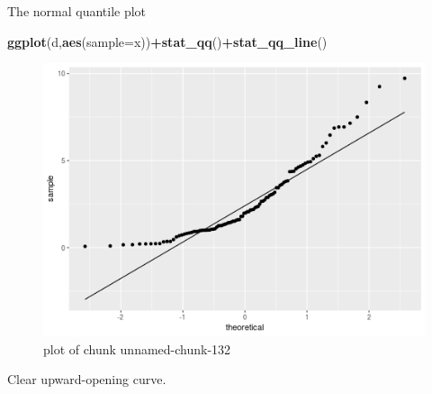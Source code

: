\documentclass[ignorenonframetext,]{beamer}
\newenvironment{Shaded}{\begin{snugshade}}{\end{snugshade}}
\newcommand{\DataTypeTok}[1]{\textcolor[rgb]{0.13,0.29,0.53}{#1}}
\newcommand{\KeywordTok}[1]{\textcolor[rgb]{0.13,0.29,0.53}{\textbf{#1}}}
\newcommand{\NormalTok}[1]{#1}
\newcommand{\OperatorTok}[1]{\textcolor[rgb]{0.81,0.36,0.00}{\textbf{#1}}}
\begin{document}
\begin{frame}[fragile]{The normal quantile plot}
\protect\hypertarget{the-normal-quantile-plot-4}{}

\begin{Shaded}
\begin{Highlighting}[]
\KeywordTok{ggplot}\NormalTok{(d,}\KeywordTok{aes}\NormalTok{(}\DataTypeTok{sample=}\NormalTok{x))}\OperatorTok{+}\KeywordTok{stat_qq}\NormalTok{()}\OperatorTok{+}\KeywordTok{stat_qq_line}\NormalTok{()}
\end{Highlighting}
\end{Shaded}

\begin{figure}
\centering
\includegraphics{figure/unnamed-chunk-132-1.png}
\caption{plot of chunk unnamed-chunk-132}
\end{figure}

Clear upward-opening curve.

\end{frame}
\end{document}
